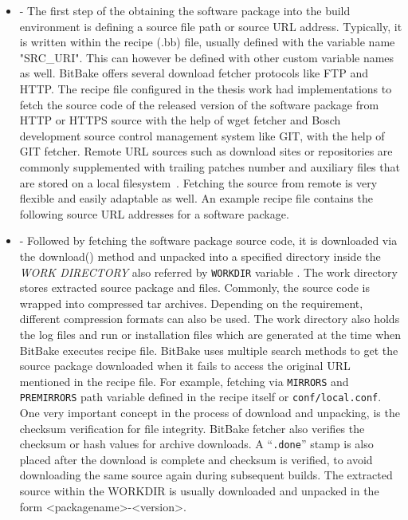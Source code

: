 \begin{itemize}
 
\item {} - The first step of the obtaining the software package into the build environment is defining a source file path or source \ac{URL} address. Typically, it is written within the recipe (.bb) file, usually defined with the variable name "SRC\_URI". This can however be defined with other custom variable names as well. BitBake offers several download fetcher protocols like \ac{FTP} and \ac{HTTP}. The recipe file configured in the thesis work had implementations to fetch the source code of the released version of the software package from \ac{HTTP} or \ac{HTTPS} source with the help of wget fetcher and Bosch development source control management system like GIT, with the help of GIT fetcher. Remote \ac{URL} sources such as download sites or repositories are commonly supplemented with trailing patches number and auxiliary files that are stored on a local filesystem~\parencite{Reference1}. Fetching the source from remote is very flexible and easily adaptable as well. An example recipe file contains the following source \ac{URL} addresses for a software package.

\vspace{0.5cm}
\lstset{style=mystyle}

\vspace{0.5cm}

\item {} - Followed by fetching the software package source code, it is downloaded via the download() method and unpacked into a specified directory inside the \emph{WORK DIRECTORY} also referred by \texttt{WORKDIR} variable . The work directory stores extracted source package and files. Commonly, the source code is wrapped into compressed tar archives. Depending on the requirement, different compression formats can also be used.  The work directory also holds the log files and run or installation files which are generated at the time when BitBake executes recipe file.  BitBake uses multiple search methods to get the source package downloaded when it fails to access the original \ac{URL} mentioned in the recipe file. For example, fetching via \texttt{MIRRORS} and \texttt{PREMIRRORS} path variable defined in the recipe itself or \texttt{conf/local.conf}. One very important concept in the process of download and unpacking, is the checksum verification for file integrity. BitBake fetcher also verifies the checksum or hash values for archive downloads.  A “\texttt{.done}” stamp is also placed after the download is complete and checksum is verified, to avoid downloading the same source again during subsequent builds. The extracted source within the WORKDIR is usually downloaded and unpacked in the form <packagename>-<version>.


\end{itemize}
